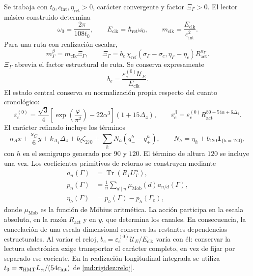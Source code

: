 Se trabaja con $t_0,c_{\mathrm{int}},\eta_{\mathrm{ret}}>0$, carácter
convergente y factor $\Xi_\Gamma>0$. El lector másico construido determina
\begin{equation}
 \omega_0=\frac{2\pi}{108t_0},\qquad
 E_{\mathrm{clk}}=\hbar_{\mathrm{ret}}\omega_0,\qquad
 m_{\mathrm{clk}}=\frac{E_{\mathrm{clk}}}{c_{\mathrm{int}}^2}.
 \label{md:hib:reloj}
\end{equation}
Para una ruta con realización escalar,
\begin{equation}
 m_\Gamma^\beta=m_{\mathrm{clk}}\Xi_\Gamma,\qquad
 \Xi_\Gamma=b_e\,
 \chi_{\mathrm{ref}}(\sigma_\Gamma-\sigma_e,\eta_\Gamma-\eta_e)
 R_{\mathrm{act}}^{\kappa_\Gamma}.
 \label{md:hib:factor-ruta}
\end{equation}
$\Xi_\Gamma$ abrevia el factor estructural de ruta. Se conserva expresamente
\begin{equation}
 b_e=\frac{\varepsilon_e^{(0)}\mathcal U_E}{E_{\mathrm{clk}}}.
 \label{md:hib:normalizacion-electron}
\end{equation}
El estado central conserva su normalización propia respecto del cuanto
cronológico:
\begin{equation}
 \varepsilon_e^{(0)}=\frac{\sqrt3}{4}
 \left[\exp\!\left(\frac{\varphi}{\pi^2}\right)-22\alpha^3\right]
 (1+15\Delta_4),\qquad
 \varepsilon_e^\beta=\varepsilon_e^{(0)}
 R_{\mathrm{act}}^{80-54\alpha+6\Delta_4}.
 \label{md:hib:electron}
\end{equation}
El carácter refinado incluye los términos
\begin{equation}
 n_Ax+\frac{s_C}{6}y+k_{\Delta_4}\Delta_4+b_\zeta\zeta_{270}
 +\sum_h N_h(q_-^h-q_+^h),\qquad
 N_h=\eta_h+b_{120}\mathbf 1_{\{h=120\}},
 \label{md:hib:caracter}
\end{equation}
con $h$ en el semigrupo generado por $90$ y $120$. El término de altura
$120$ se incluye una vez. Los coeficientes primitivos de retorno se
construyen mediante
\begin{equation}
 \begin{aligned}
 a_n(\Gamma)&=\operatorname{Tr}(R_\Gamma U_\Gamma^n),\\
 p_n(\Gamma)&=\frac1n\sum_{d\mid n}\mu_{\mathrm{Mob}}(d)
                         a_{n/d}(\Gamma),\\
 \eta_h(\Gamma)&=p_h(\Gamma)-p_h(\Gamma_e),
 \end{aligned}
 \label{md:hib:retornos-primitivos}
\end{equation}
donde $\mu_{\mathrm{Mob}}$ es la función de Möbius aritmética.
La acción participa en la escala absoluta, en la razón $R_{\mathrm{act}}$
y en $y$, que determina los canales. En consecuencia, la cancelación de
una escala dimensional conserva las restantes dependencias estructurales.
Al variar el reloj, $b_e=\varepsilon_e^{(0)}\mathcal U_E/E_{\mathrm{clk}}$
varía con él: conservar la lectura electrónica exige transportar el
carácter completo, en vez de fijar por separado ese cociente.
En la realización longitudinal integrada se utiliza
$t_0=\pi_{\rm HMT}L_\alpha/(54c_{\mathrm{int}})$ de
\eqref{md:rigidez:reloj}.

